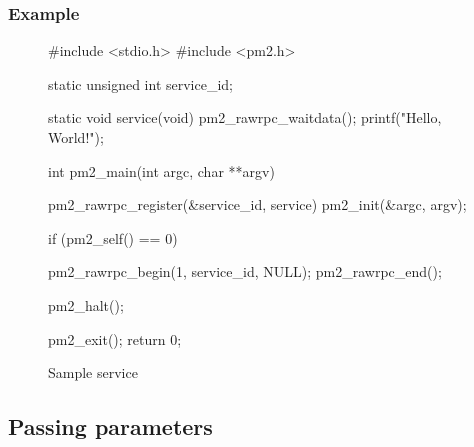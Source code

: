 \documentclass[a4paper,11pt]{article}
\begin{document}
\subsubsection{Example}
\begin{figure}
\begin{center}
\begin{boxedminipage}{0.8\textwidth}
\begin{footnotesize}
\begin{listing}{0}
 #include <stdio.h>
 #include <pm2.h>

 static unsigned int service_id;

 static void service(void)
 {
   pm2_rawrpc_waitdata();
   printf("Hello, World!\n");
 }

 int pm2_main(int argc, char **argv)
 {
   pm2_rawrpc_register(&service_id, service)
   pm2_init(&argc, argv);

   if (pm2_self() == 0)
     {
       pm2_rawrpc_begin(1, service_id, NULL);
       pm2_rawrpc_end();

       pm2_halt();
     }
   pm2_exit();
   return 0;
 }
\end{listing}
\end{footnotesize}
\end{boxedminipage}
\end{center}
\caption{Sample service\label{fig:ex3}}
\end{figure}

\subsection{Passing parameters}
\end{document}
